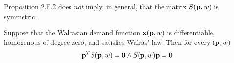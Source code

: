 \documentclass{article}
\begin{document}
 			\begin{remark}
 				Proposition 2.F.2 does \emph{not} imply, in general, that the matrix $S(\textbf{p}, w)$ is symmetric.
 			\end{remark}
 			
 			\begin{proposition}[2.F.3]
 				Suppose that the Walrasian demand function $\textbf{x}(\textbf{p}, w)$ is differentiable, homogenous of degree zero, and satisfies Walras' law. Then for every $(\textbf{p}, w)$
 				\begin{equation}
 					\textbf{p}^T S(\textbf{p}, w) = \textbf{0} \land S(\textbf{p}, w) \textbf{p} = \textbf{0}
 				\end{equation}
 			\end{proposition}
\end{document}
